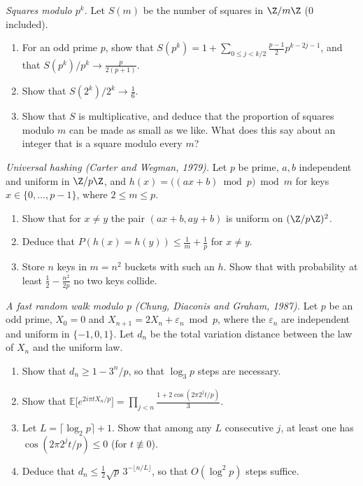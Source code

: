 \begin{exercise}[$\star\star$]\label{pb:squaresmodpk}
\emph{Squares modulo $p^k$.} Let $S(m)$ be the number of squares in $\Z/m\Z$ ($0$ included).
\begin{enumerate}[label=(\alph*)]
\item For an odd prime $p$, show that $S(p^k)=1+\sum_{0\le j<k/2}\frac{p-1}2p^{k-2j-1}$, and that $S(p^k)/p^k\to\frac p{2(p+1)}$.
\item Show that $S(2^k)/2^k\to\frac16$.
\item Show that $S$ is multiplicative, and deduce that the proportion of squares modulo $m$ can be made as small as we like.
What does this say about an integer that is a square modulo every $m$?
\end{enumerate}
\end{exercise}

\begin{exercise}[$\star$]\label{pb:hashing}
\emph{Universal hashing (Carter and Wegman, 1979).} Let $p$ be prime, $a,b$ independent and uniform in $\Z/p\Z$, and
$h(x)=\bigl((ax+b)\bmod p\bigr)\bmod m$ for keys $x\in\{0,\dots,p-1\}$, where $2\le m\le p$.
\begin{enumerate}[label=(\alph*)]
\item Show that for $x\ne y$ the pair $(ax+b,ay+b)$ is uniform on $(\Z/p\Z)^2$.
\item Deduce that $P(h(x)=h(y))\le\frac1m+\frac1p$ for $x\ne y$.
\item Store $n$ keys in $m=n^2$ buckets with such an $h$. Show that with probability at least $\frac12-\frac{n^2}{2p}$ no two keys
collide.
\end{enumerate}
\end{exercise}

\begin{exercise}[$\star\star\star$]\label{pb:cdg}
\emph{A fast random walk modulo $p$ (Chung, Diaconis and Graham, 1987).} Let $p$ be an odd prime, $X_0=0$ and
$X_{n+1}=2X_n+\varepsilon_n\bmod p$, where the $\varepsilon_n$ are independent and uniform in $\{-1,0,1\}$. Let $d_n$ be the total
variation distance between the law of $X_n$ and the uniform law.
\begin{enumerate}[label=(\alph*)]
\item Show that $d_n\ge1-3^n/p$, so that $\log_3p$ steps are necessary.
\item Show that $\mathbb E\bigl[e^{2i\pi tX_n/p}\bigr]=\prod_{j<n}\frac{1+2\cos(2\pi2^jt/p)}3$.
\item Let $L=\lceil\log_2p\rceil+1$. Show that among any $L$ consecutive $j$, at least one has $\cos(2\pi2^jt/p)\le0$ (for
$t\not\equiv0$).
\item Deduce that $d_n\le\frac12\sqrt p\,3^{-\lfloor n/L\rfloor}$, so that $O(\log^2p)$ steps suffice.
\end{enumerate}
\end{exercise}


